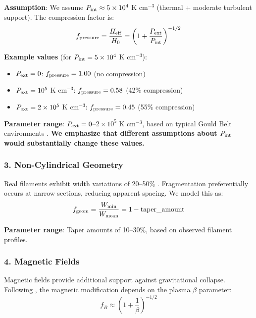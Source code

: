 \documentclass[11pt,a4paper]{article}
\begin{document}
\textbf{Assumption}: We assume $P_{\rm int} \approx 5 \times 10^4$ K cm$^{-3}$ (thermal + moderate turbulent support). The compression factor is:
\begin{equation}
f_{\rm pressure} = \frac{H_{\rm eff}}{H_0} = \left(1 + \frac{P_{\rm ext}}{P_{\rm int}}\right)^{-1/2}
\end{equation}

\textbf{Example values} (for $P_{\rm int} = 5 \times 10^4$ K cm$^{-3}$):
\begin{itemize}
    \item $P_{\rm ext} = 0$: $f_{\rm pressure} = 1.00$ (no compression)
    \item $P_{\rm ext} = 10^5$ K cm$^{-3}$: $f_{\rm pressure} = 0.58$ (42\% compression)
    \item $P_{\rm ext} = 2 \times 10^5$ K cm$^{-3}$: $f_{\rm pressure} = 0.45$ (55\% compression)
\end{itemize}

\textbf{Parameter range}: $P_{\rm ext} = 0$--$2 \times 10^5$ K cm$^{-3}$, based on typical Gould Belt environments \citep{Planck2011}. \textbf{We emphasize that different assumptions about $P_{\rm int}$ would substantially change these values.}

\subsubsection{3. Non-Cylindrical Geometry}

Real filaments exhibit width variations of 20--50\% \citep{Arzoumanian2019}. Fragmentation preferentially occurs at narrow sections, reducing apparent spacing. We model this as:
\begin{equation}
f_{\rm geom} = \frac{W_{\rm min}}{W_{\rm mean}} = 1 - \text{taper\_amount}
\end{equation}

\textbf{Parameter range}: Taper amounts of 10--30\%, based on observed filament profiles.

\subsubsection{4. Magnetic Fields}

Magnetic fields provide additional support against gravitational collapse. Following \citet{Hennebelle2013}, the magnetic modification depends on the plasma $\beta$ parameter:
\begin{equation}
f_B \approx \left(1 + \frac{1}{\beta}\right)^{-1/2}
\end{equation}
\end{document}
